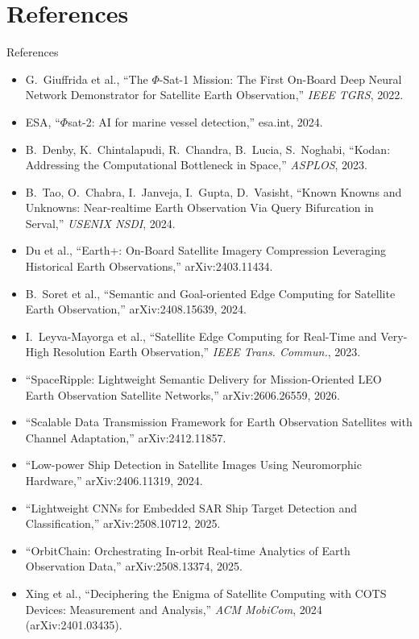 \documentclass[aspectratio=169,10pt]{beamer}
\begin{document}
\section*{References}
\begin{frame}[allowframebreaks]{References}
\scriptsize
\begin{itemize}
  \item G.~Giuffrida et al., ``The $\Phi$-Sat-1 Mission: The First On-Board Deep Neural Network Demonstrator for Satellite Earth Observation,'' \emph{IEEE TGRS}, 2022.
  \item ESA, ``$\Phi$sat-2: AI for marine vessel detection,'' esa.int, 2024.
  \item B.~Denby, K.~Chintalapudi, R.~Chandra, B.~Lucia, S.~Noghabi, ``Kodan: Addressing the Computational Bottleneck in Space,'' \emph{ASPLOS}, 2023.
  \item B.~Tao, O.~Chabra, I.~Janveja, I.~Gupta, D.~Vasisht, ``Known Knowns and Unknowns: Near-realtime Earth Observation Via Query Bifurcation in Serval,'' \emph{USENIX NSDI}, 2024.
  \item Du et al., ``Earth+: On-Board Satellite Imagery Compression Leveraging Historical Earth Observations,'' arXiv:2403.11434.
  \item B.~Soret et al., ``Semantic and Goal-oriented Edge Computing for Satellite Earth Observation,'' arXiv:2408.15639, 2024.
  \item I.~Leyva-Mayorga et al., ``Satellite Edge Computing for Real-Time and Very-High Resolution Earth Observation,'' \emph{IEEE Trans. Commun.}, 2023.
  \item ``SpaceRipple: Lightweight Semantic Delivery for Mission-Oriented LEO Earth Observation Satellite Networks,'' arXiv:2606.26559, 2026.
  \item ``Scalable Data Transmission Framework for Earth Observation Satellites with Channel Adaptation,'' arXiv:2412.11857.
  \item ``Low-power Ship Detection in Satellite Images Using Neuromorphic Hardware,'' arXiv:2406.11319, 2024.
  \item ``Lightweight CNNs for Embedded SAR Ship Target Detection and Classification,'' arXiv:2508.10712, 2025.
  \item ``OrbitChain: Orchestrating In-orbit Real-time Analytics of Earth Observation Data,'' arXiv:2508.13374, 2025.
  \item Xing et al., ``Deciphering the Enigma of Satellite Computing with COTS Devices: Measurement and Analysis,'' \emph{ACM MobiCom}, 2024 (arXiv:2401.03435).

\end{itemize}
\end{frame}
\end{document}
